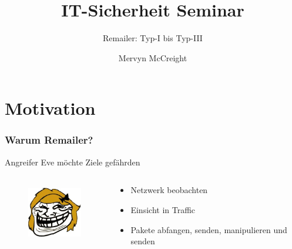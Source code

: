 \documentclass{beamer}
\title[Seminar]{IT-Sicherheit Seminar}
\subtitle[Remailer]{Remailer: Typ-I bis Typ-III}
\author[M. McCreight]{Mervyn McCreight}
\institute[FH-Wedel]{FH-Wedel}
\begin{document}
\frame{\titlepage}

\section{Motivation}
\begin{frame}
	\frametitle{Warum Remailer?}
	
	
	 {
	\begin{alertblock}{Angreifer Eve möchte Ziele gefährden}
		\begin{columns}[T]
		\begin{column}{2.5cm}
				\vspace{-.3cm}
				\begin{figure}
					\includegraphics[height=2.5cm]{bilder/eve.jpg}
				\end{figure}
		\end{column}
		\begin{column}{7cm}
			\begin{itemize}	
				\item Netzwerk beobachten
				\item Einsicht in Traffic
				\item Pakete abfangen, senden, manipulieren und senden
			\end{itemize}
		\end{column}
	\end{columns}
	\end{alertblock}
	}

\end{frame}
\end{document}
